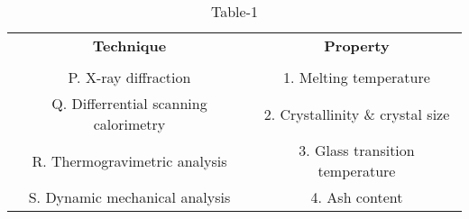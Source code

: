 \begin{table}[htbp]
  \centering
  \caption{Table-1}
  \label{tab:tables/table1.tex}
  \begin{tabular}{cc}
  \textbf{Technique} & \textbf{Property} \\ \\
    P. X-ray diffraction & 1. Melting temperature \\
    Q. Differrential scanning calorimetry & 2. Crystallinity \& crystal size \\
    R. Thermogravimetric analysis & 3. Glass transition temperature \\
    S. Dynamic mechanical analysis & 4. Ash content \\
    
  \end{tabular}
\end{table}